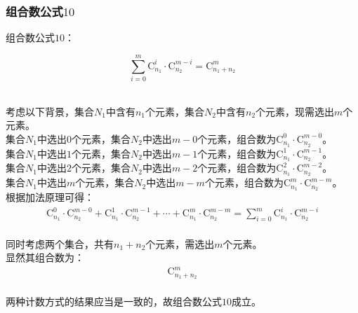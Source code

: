 \documentclass[UTF8]{ctexart}
\begin{document}
\subsubsection{组合数公式$10$}
    组合数公式$10$：
    \begin{large}
        \begin{equation*}
            \sum_{i=0}^m\mathrm{C}_{n_1}^i\cdot\mathrm{C}_{n_2}^{m-i}=\mathrm{C}_{n_1+n_2}^m
        \end{equation*}
    \end{large}\\
    考虑以下背景，集合$N_1$中含有$n_1$个元素，集合$N_2$中含有$n_2$个元素，现需选出$m$个元素。\\[5mm]
    集合$N_1$中选出$0$个元素，集合$N_2$中选出$m-0$个元素，组合数为$\mathrm{C}_{n_1}^{0}\cdot\mathrm{C}_{n_2}^{m-0}$。\\[3mm]
    集合$N_1$中选出$1$个元素，集合$N_2$中选出$m-1$个元素，组合数为$\mathrm{C}_{n_1}^{1}\cdot\mathrm{C}_{n_2}^{m-1}$。\\[3mm]
    集合$N_1$中选出$2$个元素，集合$N_2$中选出$m-2$个元素，组合数为$\mathrm{C}_{n_1}^{2}\cdot\mathrm{C}_{n_2}^{m-2}$。\\[3mm]
    集合$N_1$中选出$m$个元素，集合$N_2$中选出$m-m$个元素，组合数为$\mathrm{C}_{n_1}^{m}\cdot\mathrm{C}_{n_2}^{m-m}$。\\[3mm]
    根据加法原理可得：
    \setcounter{equation}{0}
    \begin{align}
        \mathrm{C}_{n_1}^{0}\cdot\mathrm{C}_{n_2}^{m-0}+\mathrm{C}_{n_1}^{1}\cdot\mathrm{C}_{n_2}^{m-1}+\cdots+\mathrm{C}_{n_1}^{m}\cdot\mathrm{C}_{n_2}^{m-m}=\sum_{i=0}^m\mathrm{C}_{n_1}^i\cdot\mathrm{C}_{n_2}^{m-i}
    \end{align}\\
    同时考虑两个集合，共有$n_1+n_2$个元素，需选出$m$个元素。\\[3mm]
    显然其组合数为：
    \begin{align}
        \mathrm{C}_{n_1+n_2}^m
    \end{align}\\
    两种计数方式的结果应当是一致的，故组合数公式$10$成立。

\newpage
\end{document}
